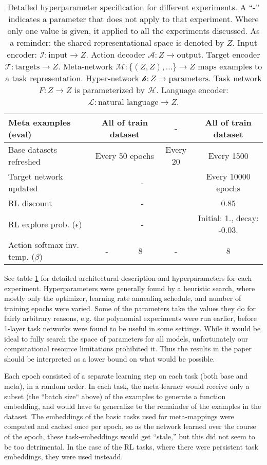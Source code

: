 \begin{table}
\begin{tabular}{|p{3cm}||c|c|c|c|}
Meta examples (eval) & \multicolumn{2}{c|}{All of train dataset} & - & All of train dataset \\\hline
Base datasets refreshed & \multicolumn{2}{c|}{Every 50 epochs} & Every 20 & Every 1500  \\\hline
Target network updated & \multicolumn{3}{c|}{-} & Every 10000 epochs  \\\hline
RL discount & \multicolumn{3}{c|}{-} & 0.85 \\\hline
RL explore prob. (\(\epsilon\)) & \multicolumn{3}{c|}{-} & \multicolumn{1}{p{2.3cm}|}{Initial: 1., decay: -0.03.}\\\hline
Action softmax inv. temp. (\(\beta\)) & - & 8 & - & 8\\\hline
\end{tabular}
\caption[Detailed hyperparameter specification.]{Detailed hyperparameter specification for different experiments. A ``-'' indicates a parameter that does not apply to that experiment. Where only one value is given, it applied to all the experiments discussed. As a reminder: the shared representational space is denoted by $Z$. Input encoder: $\mathcal{I}: \text{input} \rightarrow Z$. Action decoder $\mathcal{A}: Z \rightarrow \text{output}$. Target encoder $\mathcal{T}: \text{targets} \rightarrow Z$. Meta-network $\mathcal{M}: \{(Z, Z), ...\} \rightarrow Z $ maps examples to a task representation. Hyper-network $\mathcal{h}: Z \rightarrow \text{parameters}$. Task network $F: Z \rightarrow Z$ is parameterized by $\mathcal{H}$. Language encoder: $\mathcal{L}: \text{natural language} \rightarrow Z$. } \label{supp_hyperparameter_table}
\end{table}
See table \ref{supp_hyperparameter_table} for detailed architectural description and hyperparameters for each experiment. Hyperparameters were generally found by a heuristic search, where mostly only the optimizer, learning rate annealing schedule, and number of training epochs were varied. Some of the parameters take the values they do for fairly arbitrary reasons, e.g. the polynomial experiments were run earlier, before 1-layer task networks were found to be useful in some settings. While it would be ideal to fully search the space of parameters for all models, unfortunately our computational resource limitations prohibited it. Thus the results in the paper should be interpreted as a lower bound on what would be possible. \par
Each epoch consisted of a separate learning step on each task (both base and meta), in a random order. In each task, the meta-learner would receive only a subset (the ``batch size`` above) of the examples to generate a function embedding, and would have to generalize to the remainder of the examples in the dataset. The embeddings of the basic tasks used for meta-mappings were computed and cached once per epoch, so as the network learned over the course of the epoch, these task-embeddings would get ``stale,'' but this did not seem to be too detrimental. In the case of the RL tasks, where there were persistent task embeddings, they were used insteadd.\par
